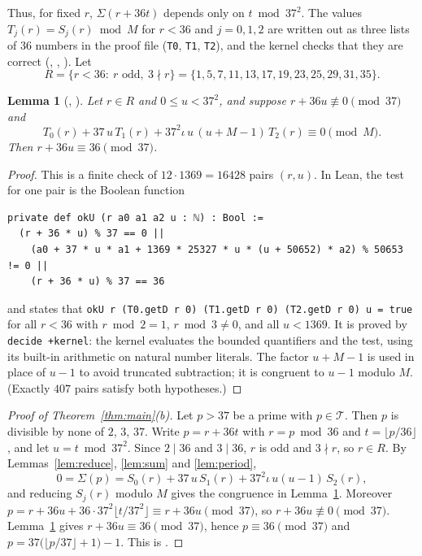 \documentclass[11pt]{amsart}
\theoremstyle{plain}
\newtheorem{lemma}[theorem]{Lemma}
\theoremstyle{definition}
\newcommand{\code}[1]{\texttt{#1}}
\newcommand{\Term}{\mathcal{T}}
\begin{document}
Thus, for fixed $r$, $\Sigma(r+36t)$ depends only on $t\bmod 37^2$. The values $T_j(r)=S_j(r)\bmod M$ for $r<36$ and $j=0,1,2$ are written out as three lists of $36$ numbers in the proof file (\code{T0}, \code{T1}, \code{T2}), and the kernel checks that they are correct (, , ). Let
\[
  R=\{r<36:\ r\text{ odd},\ 3\nmid r\}=\{1,5,7,11,13,17,19,23,25,29,31,35\}.
\]

\begin{lemma}[, ]\label{lem:finite}
Let $r\in R$ and $0\le u<37^2$, and suppose $r+36u\not\equiv0\pmod{37}$ and
\[
  T_0(r)+37\,u\,T_1(r)+37^2\iota\,u\,(u+M-1)\,T_2(r)\equiv0\pmod M.
\]
Then $r+36u\equiv36\pmod{37}$.
\end{lemma}

\begin{proof}
This is a finite check of $12\cdot1369=16428$ pairs $(r,u)$. In Lean, the test for one pair is the Boolean function
\begin{lstlisting}
private def okU (r a0 a1 a2 u : ℕ) : Bool :=
  (r + 36 * u) % 37 == 0 ||
    (a0 + 37 * u * a1 + 1369 * 25327 * u * (u + 50652) * a2) % 50653 != 0 ||
    (r + 36 * u) % 37 == 36
\end{lstlisting}
and  states that \code{okU r (T0.getD r 0) (T1.getD r 0) (T2.getD r 0) u = true} for all $r<36$ with $r\bmod 2=1$, $r\bmod 3\ne0$, and all $u<1369$. It is proved by \texttt{decide +kernel}: the kernel evaluates the bounded quantifiers and the test, using its built-in arithmetic on natural number literals. The factor $u+M-1$ is used in place of $u-1$ to avoid truncated subtraction; it is congruent to $u-1$ modulo $M$. (Exactly $407$ pairs satisfy both hypotheses.)
\end{proof}

\begin{proof}[Proof of Theorem~\ref{thm:main}(b)]
Let $p>37$ be a prime with $p\in\Term$. Then $p$ is divisible by none of $2$, $3$, $37$. Write $p=r+36t$ with $r=p\bmod36$ and $t=\lfloor p/36\rfloor$, and let $u=t\bmod37^2$. Since $2\mid36$ and $3\mid36$, $r$ is odd and $3\nmid r$, so $r\in R$. By Lemmas~\ref{lem:reduce}, \ref{lem:sum} and \ref{lem:period},
\[
  0=\Sigma(p)=S_0(r)+37\,u\,S_1(r)+37^2\iota\,u(u-1)\,S_2(r),
\]
and reducing $S_j(r)$ modulo $M$ gives the congruence in Lemma~\ref{lem:finite}. Moreover $p=r+36u+36\cdot37^2\lfloor t/37^2\rfloor\equiv r+36u\pmod{37}$, so $r+36u\not\equiv0\pmod{37}$. Lemma~\ref{lem:finite} gives $r+36u\equiv36\pmod{37}$, hence $p\equiv36\pmod{37}$ and $p=37\bigl(\lfloor p/37\rfloor+1\bigr)-1$. This is .
\end{proof}
\end{document}
